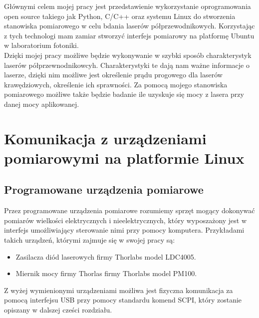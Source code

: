 \documentclass[a4paper, portrait,12pt]{report}
\begin{document}
Głównymi celem mojej pracy jest przedstawienie wykorzystanie oprogramowania
open source takiego jak Python, C/C++ oraz systemu Linux do stworzenia stanowiska pomiarowego w celu bdania laserów półprzewodnikowych. Korzystając z tych technologi mam zamiar stworzyć interfejs pomiarowy na platformę Ubuntu
w laboratorium fotoniki. \\

Dzięki mojej pracy możliwe będzie wykonywanie w szybki sposób charakterystyk laserów półprzewnodnikowcyh. Charakterystyki te dają nam ważne informacje o laserze, dzięki nim możliwe jest określenie prądu progowego dla laserów krawędziowych, określenie ich sprawności. Za pomocą mojego stanowiska pomiarowego możliwe także będzie badanie ile uzyskuje się mocy z lasera przy danej mocy aplikowanej.



\chapter{Komunikacja z urządzeniami pomiarowymi na platformie Linux}
\section{Programowane urządzenia pomiarowe}
Przez  programowane urządzenia pomiarowe rozumiemy sprzęt mogący dokonywać pomiarów wielkości elektrycznych i nieelektrycznych, który wyposzażony jest w interfejs umożliwiający sterowanie nimi przy pomocy komputera. Przykładami takich urządzeń, którymi zajmuje się w swojej pracy są:
\begin{itemize}
\item Zasilacza diód laserowych firmy Thorlabs model LDC4005.
\item Miernik mocy firmy Thorlas firmy Thorlabs model PM100.
\end{itemize}
Z wyżej wymienionymi urządzeniami możliwa jest fizyczna komunikacja za pomocą interfejsu USB przy pomocy standardu komend SCPI, który zostanie opiszany w dalszej cześci rozdziału.
\end{document}

